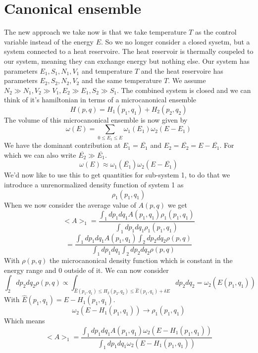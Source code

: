 \documentclass{report}
\begin{document}
\section{Canonical ensemble}
The new approach we take now is that we take temperature $T$ as the control variable instead of the energy $E$. So we no longer consider a closed sysetm, but a system connected to a heat reservoire. The heat reservoir is thermally coupeled to our system, meaning they can exchange energy but nothing else. Our system has parameters $E_1, S_1, N_1, V_1$ and temperature $T$ and the heat reservoire has parameters $E_2,S_2,N_2,V_2$ and the same temperature $T$. We assume $N_2 \gg N_1, V_2 \gg V_1, E_2\gg E_1, S_2\gg S_1$. The combined system is closed and we can think of it's hamiltonian in terms of a microcanonical ensemble \[
  H\left( p,q \right) = H_1\left( p_1,q_1 \right) + H_2\left( p_2,q_2 \right) 
\] 
The volume of this microcanonical ensemble is now given by \[
  \omega(E) = \sum_{0 \le E_1 \le E} \omega_1\left( E_1 \right) \omega_2\left( E-E_1 \right)  
\] We have the dominant contribution at $E_1 = \overline{E_1}$ and $E_2 = \overline{E_2} = E - \overline{ E_1}$. For which we can also write $\overline{E_2} \gg \overline{E_1}$. \[
\omega(E) \approx \omega_1\left( \overline{E_1} \right) \omega_2\left( E - \overline{E_1} \right) 
\] 
We'd now like to use this to get quantities for sub-system 1, to do that we introduce a unrenormalized density function of system 1 as \[
  \rho_1\left( p_1, q_1 \right)
\] 
When we now consider the average value of $A\left( p,q \right) $ we get \[
  <A>_1 = \frac{\int_1 dp_1 dq_1 A\left( p_1,q_1 \right) \rho_1\left( p_1,q_1 \right) }{\int_1 dp_1 dq_1 \rho_1\left( p_1,q_1 \right) }
\] \[
= \frac{\int_1 dp_1 dq_1 A\left( p_1,q_1 \right) \int_2 dp_2dq_2 \rho\left( p,q \right) }{\int_1 dp_1 dq_1 \int_2 dp_2 dq_2 \rho\left( p,q \right) }
\] 
With $\rho\left( p,q \right) $ the microcanonical density function which is constant in the energy range and $0$ outside of it. We can now consider \[
  \int_2 dp_2 dq_2 \rho\left( p,q \right) \propto \int_{\hat{E}\left( p_1,q_1 \right) \le H_2\left( p_2,q_2 \right) \le \hat{E}\left( p_1, q_1 \right) + \delta E} dp_2 dq_2 = \omega_2\left( \hat{E}\left( p_1,q_1 \right)  \right) 
\] With $\hat{E}\left( p_1,q_1 \right) = E - H_1\left( p_1,q_1 \right) $.
\[
  \omega_2\left( E - H_1\left( p_1,q_1 \right)  \right) \to \rho_1\left( p_1,q_1 \right) 
\] Which means \[
<A>_1 = \frac{\int_1 dp_1 dq_1 A\left( p_1,q_1 \right) \omega_2\left( E - H_1\left( p_1,q_1 \right)  \right) }{\int_1 dp_1 dq_1 \omega_2\left( E - H_1\left( p_1,q_1 \right)  \right) }
\] 
\end{document}
